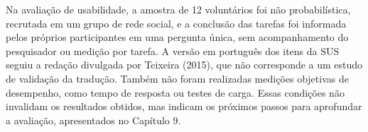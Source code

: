 Na avaliação de usabilidade, a amostra de 12 voluntários foi não probabilística, recrutada em um grupo de rede social, e a conclusão das tarefas foi informada pelos próprios participantes em uma pergunta única, sem acompanhamento do pesquisador ou medição por tarefa. A versão em português dos itens da SUS seguiu a redação divulgada por Teixeira (2015), que não corresponde a um estudo de validação da tradução. Também não foram realizadas medições objetivas de desempenho, como tempo de resposta ou testes de carga. Essas condições não invalidam os resultados obtidos, mas indicam os próximos passos para aprofundar a avaliação, apresentados no Capítulo 9.
